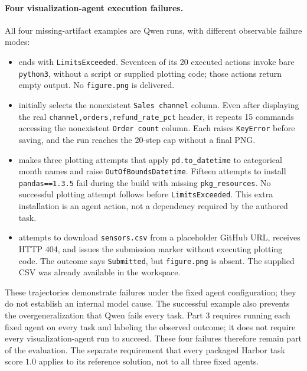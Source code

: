 \documentclass[11pt]{article}
\begin{document}
\paragraph{Four visualization-agent execution failures.}
All four missing-artifact examples are Qwen runs, with different observable
failure modes:
\begin{itemize}
\item {} ends with
\texttt{LimitsExceeded}. Seventeen of its 20 executed actions invoke bare
\texttt{python3}, without a script or supplied plotting code; those actions
return empty output. No \texttt{figure.png} is delivered.
\item {} initially selects the nonexistent
\texttt{Sales channel} column. Even after displaying the real
\texttt{channel,orders,refund\_rate\_pct} header, it repeats 15 commands
accessing the nonexistent \texttt{Order count} column. Each raises
\texttt{KeyError} before saving, and the run reaches the 20-step cap without
a final PNG.
\item {} makes three plotting attempts that
apply \texttt{pd.to\_datetime} to categorical month names and raise
\texttt{OutOfBoundsDatetime}. Fifteen attempts to install
\texttt{pandas==1.3.5} fail during the build with missing
\texttt{pkg\_resources}. No successful plotting attempt follows before
\texttt{LimitsExceeded}. This extra installation is an agent action, not
a dependency required by the authored task.
\item {} attempts to download
\texttt{sensors.csv} from a placeholder 
GitHub URL, receives HTTP 404, and issues the submission marker without
executing plotting code. The outcome says \texttt{Submitted}, but
\texttt{figure.png} is absent. The supplied CSV was already available in
the workspace.
\end{itemize}
These trajectories demonstrate failures under the fixed agent configuration;
they do not establish an internal model cause.
The successful  example also prevents the
overgeneralization that Qwen fails every task.
Part 3 requires running each fixed agent on every task and labeling the
observed outcome; it does not require every visualization-agent run to
succeed. These four failures therefore remain part of the evaluation.
The separate requirement that every packaged Harbor task score $1.0$
applies to its reference solution, not to all three fixed agents.
\end{document}
